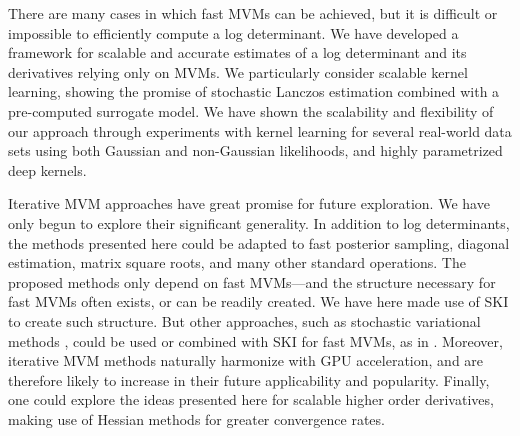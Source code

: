 There are many cases in which fast MVMs can be achieved, but it is difficult or
impossible to efficiently compute a log determinant.  We have developed a
framework for scalable and accurate estimates of a log determinant and its
derivatives relying only on MVMs.  We particularly consider scalable kernel
learning, showing the promise of stochastic Lanczos estimation combined with a
pre-computed surrogate model.  We have shown the scalability and flexibility of
our approach through experiments with kernel learning for several real-world
data sets using both Gaussian and non-Gaussian likelihoods, and highly
parametrized deep kernels.

Iterative MVM approaches have great promise for future exploration. We have only
begun to explore their significant generality.  In addition to log determinants,
the methods presented here could be adapted to fast posterior sampling, diagonal
estimation, matrix square roots, and many other standard operations.  The
proposed methods only depend on fast MVMs---and the structure necessary for fast
MVMs often exists, or can be readily created.  We have here made use of SKI 
\citep{wilson2015kernel} to create such structure. But other approaches, such as
stochastic variational methods \citep{hensman2013uai}, could be used or combined
with SKI for fast MVMs, as in \citep{wilson2016stochastic}.  Moreover, iterative
MVM methods naturally harmonize with GPU acceleration, and are therefore likely
to increase in their future applicability and popularity.  Finally, one could
explore the ideas presented here for scalable higher order derivatives, making
use of Hessian methods for greater convergence rates.